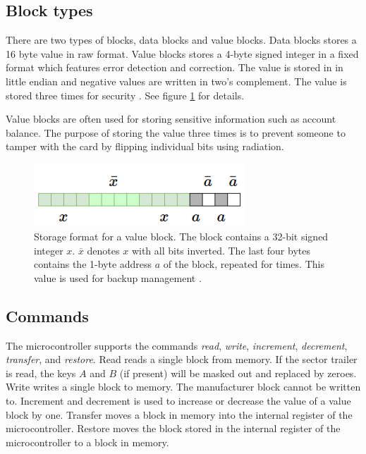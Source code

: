 \documentclass[10pt,twocolumn]{article}
\begin{document}
\subsection{Block types}
There are two types of blocks, data blocks and value blocks. Data blocks stores a 16 byte value in raw format. Value blocks stores a 4-byte signed integer in a fixed format which features error detection and correction. The value is stored in in little endian and negative values are written in two's complement. The value is stored three times for security \cite{mifare-sheet}. See figure \ref{fig:value-block} for details.

Value blocks are often used for storing sensitive information such as account balance. The purpose of storing the value three times is to prevent someone to tamper with the card by flipping individual bits using radiation.

\begin{figure}
\includegraphics[width=8cm]{value-block.png}
\caption{Storage format for a value block. The block contains a 32-bit signed integer $x$. $\overline{x}$ denotes $x$ with all bits inverted. The last four bytes contains the 1-byte address $a$ of the block, repeated for times. This value is used for backup management \cite{mifare-sheet}.}
\label{fig:value-block}
\end{figure}

\subsection{Commands}
The microcontroller supports the commands \textit{read}, \textit{write}, \textit{increment}, \textit{decrement}, \textit{transfer}, and \textit{restore}. Read reads a single block from memory. If the sector trailer is read, the keys $A$ and $B$ (if present) will be masked out and replaced by zeroes. Write writes a single block to memory. The manufacturer block cannot be written to. Increment and decrement is used to increase or decrease the value of a value block by one. Transfer moves a block in memory into the internal register of the microcontroller. Restore moves the block stored in the internal register of the microcontroller to a block in memory.
\end{document}
